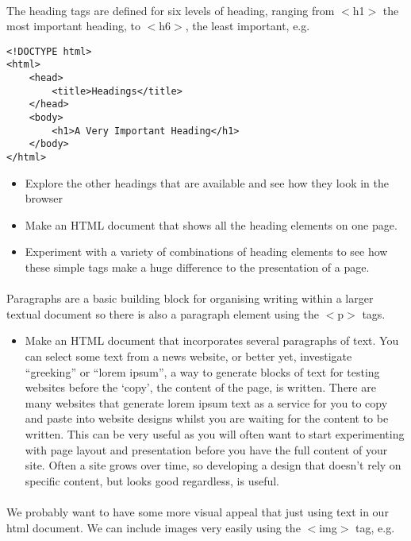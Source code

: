 \documentclass[10pt, a4paper]{article}
\begin{document}
\paragraph{} The heading tags are defined for six levels of heading, ranging from $<$h1$>$ the most important heading, to $<$h6$>$, the least important, e.g.

\begin{lstlisting}
<!DOCTYPE html>
<html>
    <head>
        <title>Headings</title>
    </head>
    <body>
        <h1>A Very Important Heading</h1>      
    </body>
</html>
\end{lstlisting}

\begin{itemize}
\item Explore the other headings that are available and see how they look in the browser
\item Make an HTML document that shows all the heading elements on one page.
\item Experiment with a variety of combinations of heading elements to see how these simple tags make a huge difference to the presentation of a page.
\end{itemize}

\paragraph{} Paragraphs are a basic building block for organising writing within a larger textual document so there is also a paragraph element using the $<$p$>$ tags.

\begin{itemize}
\item Make an HTML document that incorporates several paragraphs of text. You can select some text from a news website, or better yet, investigate ``greeking'' or ``lorem ipsum'', a way to generate blocks of text for testing websites before the `copy', the content of the page, is written. There are many websites that generate lorem ipsum text as a service for you to copy and paste into website designs whilst you are waiting for the content to be written. This can be very useful as you will often want to start experimenting with page layout and presentation before you have the full content of your site. Often a site grows over time, so developing a design that doesn't rely on specific content, but looks good regardless, is useful.
\end{itemize}

\paragraph{} We probably want to have some more visual appeal that just using text in our html document. We can include images very easily using the $<$img$>$ tag, e.g.
\end{document}
